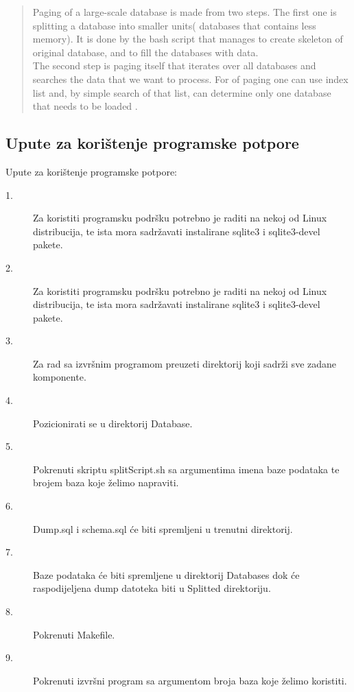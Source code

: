 \documentclass[times, utf8, zavrsni]{fer}
\begin{document}
\begin{abstract}
Paging of a large-scale database is made from two steps. The first one is splitting a database into smaller units( databases that contains less memory). It is done by the bash script that manages to create skeleton of original database, and to fill the databases with data.
\\The second step is paging itself that iterates over all databases and searches the data that we want to process. For of paging one can use index list and, by simple search of that list, can determine only one database that needs to be loaded	.

\end{abstract}

\begin{appendices}
	\chapter{Upute za korištenje programske potpore}
	Upute za korištenje programske potpore:
	\begin{description}
		\item[1.] Za koristiti programsku podršku potrebno je raditi na nekoj od Linux distribucija, te ista mora sadržavati instalirane sqlite3 i sqlite3-devel pakete.
		\item[2.] Za koristiti programsku podršku potrebno je raditi na nekoj od Linux distribucija, te ista mora sadržavati instalirane sqlite3 i sqlite3-devel pakete.
		\item[3.] Za rad sa izvršnim programom preuzeti direktorij koji sadrži sve zadane komponente.
		\item[4.] Pozicionirati se u direktorij Database.
		\item[5.] Pokrenuti skriptu splitScript.sh sa argumentima imena baze podataka te brojem baza koje želimo napraviti.
		\item[6.] Dump.sql i schema.sql će biti spremljeni u trenutni direktorij.
		\item[7.] Baze podataka će biti spremljene u direktorij Databases dok će raspodijeljena dump datoteka biti u Splitted direktoriju.
		\item[8.] Pokrenuti Makefile.
		\item[9.] Pokrenuti izvršni program sa argumentom broja baza koje želimo koristiti.
	\end{description}
\end{appendices}
\end{document}
